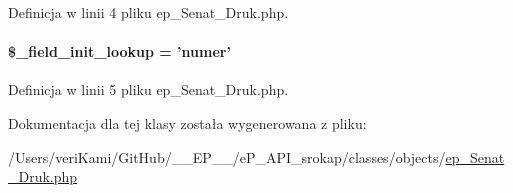 Definicja w linii 4 pliku ep\-\_\-\-Senat\-\_\-\-Druk.\-php.

\hypertarget{classep___senat___druk_a4a4d54ae35428077a7c61ec8a5139af3}{
\paragraph[{\$\-\_\-field\-\_\-init\-\_\-lookup}]{\setlength{\rightskip}{0pt plus 5cm}\$\-\_\-field\-\_\-init\-\_\-lookup = 'numer'}}\label{classep___senat___druk_a4a4d54ae35428077a7c61ec8a5139af3}


Definicja w linii 5 pliku ep\-\_\-\-Senat\-\_\-\-Druk.\-php.



Dokumentacja dla tej klasy została wygenerowana z pliku\-:\begin{DoxyCompactItemize}
\item 
/\-Users/veri\-Kami/\-Git\-Hub/\-\_\-\-\_\-\-E\-P\-\_\-\-\_\-/e\-P\-\_\-\-A\-P\-I\-\_\-srokap/classes/objects/\hyperlink{ep___senat___druk_8php}{ep\-\_\-\-Senat\-\_\-\-Druk.\-php}\end{DoxyCompactItemize}
